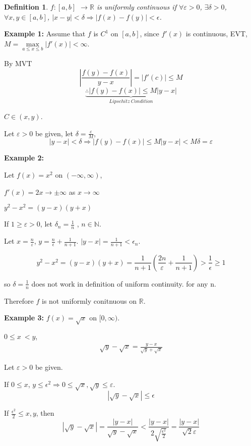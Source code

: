 \documentclass[12pt]{article}
\newcommand{\abs}[1]{\left| #1 \right|}
\theoremstyle{plain}
\newtheorem{definition}{Definition}[subsection]
\newcommand{\ep}{\varepsilon}
\begin{document}
	\begin{definition}
		$f: [a,b]$ $\to \mathbb{R}$ is uniformly continuous if $\forall \ep > 0$,
		$\exists \delta > 0$, $\forall x,y \in [a, b]$, $\abs{x-y}<\delta\Rightarrow
		\abs{f(x)-f(y)} < \epsilon$. 
	\end{definition}

	{\color{Brown}
	
		\textbf{Example 1: }
		Assume that $f$ is $C^1$ on $[a,b]$, since $f'(x)$ is continuous,
		EVT, $M=\underset{a\leq x\leq b}{\max }\abs{f'(x)}<\infty$. 

		By MVT
		\[
			\abs{\frac{f(y)-f(x)}{y-x}} = \abs{f'(c)}\leq M
		\]
		\[
			\underbrace
		{\therefore \abs{f(y)-f(x)}\leq M\abs{y-x}}_{Lipschitz\ Condition}		\]

		$C \in (x,y)$.

		Let $\ep > 0$ be given, let $\delta = \frac {\ep}M$, 
		\[
			\abs{y-x} < \delta \Rightarrow \abs{f(y)-f(x)}
			\leq M\abs{y-x} < M\delta = \ep
		\]
		
	\textbf{Example 2:}

	Let $f(x) = x^2$ on $(-\infty, \infty)$,

	$f'(x) = 2x \to \pm \infty$ as $x \to \infty$

	$y^2 - x^2 = (y-x)(y+x)$

	If $1\geq \ep > 0$, let $\delta_n = \frac 1n$ , $n\in\mathbb{N}$.

	Let $x = \frac n {\ep}$, $y = \frac{n}{\epsilon}+\frac1{n+1}$. 
	$\abs{y-x} = \frac1{n+1}<\epsilon_n$.

	\[
		y^2-x^2 = (y-x)(y+x)=\frac 1{n+1} (\frac{2n}{\ep}+\frac1{n+1})
		>\frac1{\epsilon}\geq 1
	\]

	so $\delta = \frac1n$ does not work in definition of uniform continuity. 
	for any n. 

	Therefore $f$ is not uniformly conitnuous on $\mathbb{R}$. 

	\textbf{Example 3: } $f(x) = \sqrt x$ on $[0,\infty)$. 

	$0\leq x\ < y$, 
	\begin{align*}
		\sqrt y - \sqrt x =\frac{y-x}{\sqrt y + \sqrt x}
	\end{align*}

	Let $\ep > 0$ be given. 

	If $0\leq x$, $y \leq \epsilon ^2 \Rightarrow 0\leq \sqrt x,
	\sqrt y \leq \ep$.
	\[
		\abs{\sqrt y - \sqrt x} \leq \epsilon
	\]

	If $\frac{\epsilon^2}2\leq x, y$, then
	\[
		\abs{\sqrt y - \sqrt x} = \frac{\abs{y-x}}{\sqrt y - \sqrt x}
		<\frac{\abs{y-x}}{2\sqrt {\frac{\epsilon^2}2}} 
		= \frac{\abs{y-x}}{\sqrt 2\ep}
	\]

}
\end{document}
